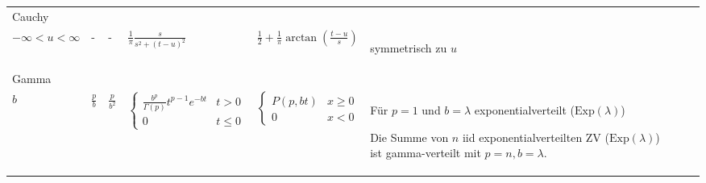 \documentclass[a4paper,10pt]{article}
\begin{document}
\begin{center}
\begin{tabularx}{\textwidth}{llXXXXXX}
		Cauchy                   & \makecell[l]{\( s > 0 \)                                                                                                                                                                                                                                                                                                                                                                                                                                                                                                                                                                 \\ \( -\infty < u < \infty \)} & - & - & $\frac{1}{\pi} \frac{s}{s^2 + (t - u)^2}$ & $\frac{1}{2} + \frac{1}{\pi} \arctan \left( \frac{t - u}{s} \right)$ & \begin{rowlist}
			\item symmetrisch zu $u$
		\end{rowlist} \\

		Gamma                    & \makecell[l]{\( p \)                                                                                                                                                                                                                                                                                                                                                                                                                                                                                                                                                                     \\ \( b \)} & $\frac{p}{b}$ & $\frac{p}{b^2}$ & $\begin{cases}
				\frac{b^p}{\Gamma(p)} t^{p - 1} e^{-bt} & t > 0    \\
				0                                       & t \leq 0
			\end{cases}$ & $\begin{cases}
				P(p, bt) & x \geq 0 \\
				0        & x < 0
			\end{cases}$ & \begin{rowlist}
				\item Für $p = 1$ und $b = \lambda$ exponentialverteilt ($\text{Exp}(\lambda)$)
				\item Die Summe von $n$ iid exponentialverteilten ZV ($\text{Exp}(\lambda)$) ist gamma-verteilt mit $p = n, b = \lambda$.
			\end{rowlist} \\

		\bottomrule
	\end{tabularx}
\end{center}
\end{document}
